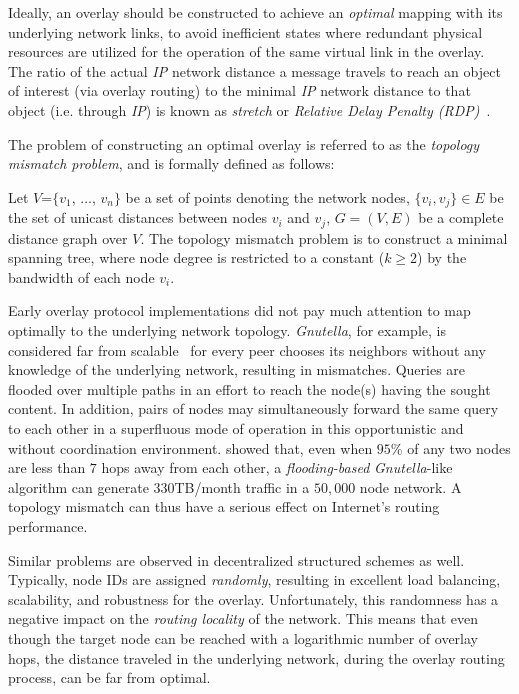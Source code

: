 Ideally, an overlay should be constructed to achieve an \emph{optimal} 
mapping with its underlying network links, to avoid
inefficient states where redundant physical resources are utilized for the
operation of the same virtual link in the overlay. The ratio of the actual
\emph{IP} network distance a message travels to reach an object of interest
(via overlay routing) to the minimal \emph{IP} network distance to that object
(i.e. through \emph{IP}) is known as \emph{stretch} or
\emph{Relative Delay Penalty (RDP)}~\cite{CRZ2000}.

The problem of constructing an optimal overlay is referred to as the
\emph{topology mismatch problem}, and is formally defined as follows:

\begin{definition}
Let $V$=$\{v_1$, $\dots$, $v_n\}$ be a set of points denoting the network nodes,
$\{v_i, v_j\} \in E$ be the set of unicast distances between nodes $v_i$ and
$v_j$, $G=(V,E)$ be a complete distance graph over $V$. The topology mismatch
problem is to construct a minimal spanning tree, where node degree is
restricted to a constant ($k\geq 2$) by the bandwidth of each node $v_i$.
\end{definition}

Early overlay protocol implementations did not pay much attention to map
optimally to the underlying network topology. {\sl Gnutella}, for example, is
considered far from scalable~\cite{ritter_gnucantscale_2001} for every peer
chooses its neighbors without any knowledge of the underlying
network, resulting in mismatches. 
Queries are flooded over multiple paths in an effort 
to reach the node(s) having the sought content. 
In addition, 
pairs of nodes may simultaneously forward the same query to each other
in a superfluous mode of operation in 
this opportunistic and without coordination environment.
\cite{matei_mapgnutella_2002} showed that, even when $95$\% of any two nodes 
are less than $7$ hops away from each other, 
a \emph{flooding-based} {\sl Gnutella}-like algorithm 
can generate $330$TB/month traffic in a $50,000$ node network. 
A topology mismatch can thus have a serious effect 
on Internet's routing performance.

Similar problems are observed in decentralized structured schemes as well.
Typically, node IDs are assigned \emph{randomly}, resulting in excellent load
balancing, scalability, and robustness for the overlay. Unfortunately, this
randomness has a negative impact on the \emph{routing locality} of the network.
This means that even though the target node can be reached with a logarithmic
number of overlay hops, the distance traveled in the underlying network, 
during the overlay routing process, can be far from optimal.  


